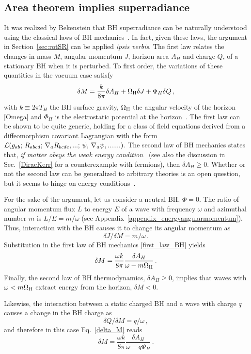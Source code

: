 \documentclass[11pt]{article}
\newcommand{\be}{\begin{equation}}
\newcommand{\ee}{\end{equation}}
\numberwithin{equation}{section} %
\begin{document}
\subsection{Area theorem implies superradiance}\label{areaimpliesSR}
It was realized by Bekenstein that BH superradiance can be naturally understood using the classical laws of BH mechanics~\cite{Bekenstein:1973mi}.
In fact, given these laws, the argument in Section~\ref{sec:rotSR} can be applied {\it ipsis verbis}.
The first law relates the changes in mass $M$, angular momentum $J$, horizon area $A_H$ and charge $Q$, of a stationary BH when it is perturbed. To first order, the variations of these quantities in the vacuum case satisfy
%
\be
\delta M = \frac{k}{8\pi}\delta A_H + \Omega_{\rm H} \delta J+\Phi_H \delta Q\,,\label{first_law_BH}
\ee
%
with $k\equiv 2\pi T_H$ the BH surface gravity, $\Omega_{\rm H}$ the angular velocity of the horizon \eqref{Omega} and $\Phi_H$ is the electrostatic potential at the horizon~\cite{Wald:1999vt}.
The first law can be shown to be quite generic, holding for a class of field equations derived from a diffeomorphism covariant Lagrangian with the form ${\cal L}(g_{ab};\,R_{abcd};\,\nabla_{a}R_{bcde},...;\,\psi,\,\nabla_{a}\psi,.......)$.
The second law of BH mechanics states that, {\it if matter obeys the weak energy condition}~\cite{Bekenstein:1973mi,Unruh:1973,Chandra} (see also the discussion in Sec.~\ref{DiracKerr} for a counterexample with fermions), then $\delta A_H\geq0$.
Whether or not the second law can be generalized to
arbitrary theories is an open question, but it seems to hinge on energy conditions~\cite{Wald:1993nt,Iyer:1994ys}.

For the sake of the argument, let us consider a neutral BH, $\Phi=0$.
The ratio of angular momentum flux $L$ to energy $E$ of a wave with frequency $\omega$ and azimuthal number $m$ is $L/E=m/\omega$ (see Appendix~\ref{appendix_energyangularmomentum}). Thus, interaction with the BH causes it to change its angular momentum as
%
\be\label{delta_J}
\delta J/\delta M=m/\omega\,.
\ee
%
Substitution in the first law of BH mechanics \eqref{first_law_BH} yields
%
\be\label{delta_M}
\delta M=\frac{\omega k}{8\pi}\frac{\delta A_H}{\omega-m\Omega_{\rm H}}\,.
\ee
%
Finally, the second law of BH thermodynamics, $\delta A_H\geq0$, implies that waves with $\omega<m \Omega_{\rm H}$ extract energy from the horizon, $\delta M<0$.

Likewise, the interaction between a static charged BH and a wave with charge $q$ causes a change in the BH charge as
%
\be\label{delta_Q}
\delta Q/\delta M=q/\omega\,,
\ee
%
and therefore in this case Eq.~\eqref{delta_M} reads
%
\be\label{delta_M2}
\delta M=\frac{\omega k}{8\pi}\frac{\delta A_H}{\omega-q\Phi_H}\,.
\ee
%
\end{document}
